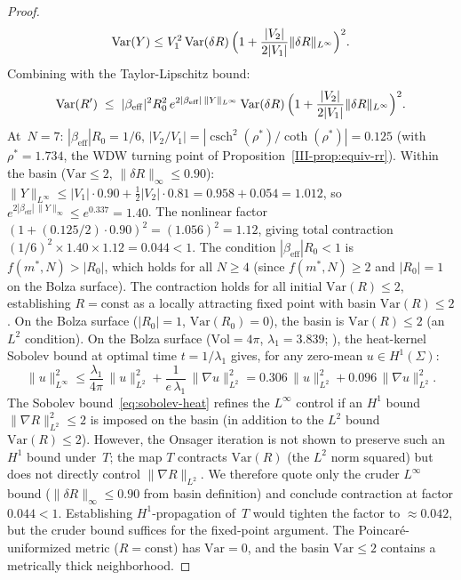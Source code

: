 \begin{proof}
\begin{equation}
  \mathrm{Var}(Y)
  \le V_1^2\,\mathrm{Var}(\delta R)\,
  \Bigl(1 + \frac{|V_2|}{2|V_1|}\|\delta R\|_{L^\infty}\Bigr)^2.
\end{equation}
Combining with the Taylor-Lipschitz bound:
\[
  \mathrm{Var}(R') \;\le\;
  |\beta_{\mathrm{eff}}|^2 R_0^2\,
  e^{2|\beta_{\mathrm{eff}}|\,\|Y\|_{L^\infty}}\,
  \mathrm{Var}(\delta R)\,
  \Bigl(1 + \frac{|V_2|}{2|V_1|}\|\delta R\|_{L^\infty}\Bigr)^2.
\]
At~$N = 7$: $|\beta_{\mathrm{eff}}| R_0 = 1/6$,
$|V_2/V_1| = |\operatorname{csch}^2(\rho^*)/\coth(\rho^*)| = 0.125$
(with $\rho^* = 1.734$, the WDW turning point of
Proposition~\ref*{III-prop:equiv-rr}).
Within the basin ($\mathrm{Var} \le 2$, $\|\delta R\|_\infty \le 0.90$):
$\|Y\|_{L^\infty} \le |V_1|\cdot 0.90 + \tfrac12|V_2|\cdot 0.81
= 0.958 + 0.054 = 1.012$,
so $e^{2|\beta_{\mathrm{eff}}|\,\|Y\|_\infty} \le e^{0.337} = 1.40$.
The nonlinear factor
$(1 + (0.125/2)\cdot 0.90)^2 = (1.056)^2 = 1.12$,
giving total contraction
$(1/6)^2 \times 1.40 \times 1.12 = 0.044 < 1$.
The condition $|\beta_{\mathrm{eff}}| R_0 < 1$ is
$f(m^*,N) > |R_0|$, which holds for all $N \ge 4$
(since $f(m^*,N) \ge 2$ and $|R_0| = 1$ on the Bolza surface).
The contraction holds for all
initial $\mathrm{Var}(R) \le 2$,
establishing $R = \mathrm{const}$ as a locally attracting
fixed point with basin $\mathrm{Var}(R) \le 2$.
On the Bolza surface ($|R_0| = 1$, $\mathrm{Var}(R_0) = 0$),
the basin is $\mathrm{Var}(R) \le 2$ (an $L^2$ condition).
On the Bolza surface ($\mathrm{Vol} = 4\pi$,
$\lambda_1 = 3.839$; \citealt{Buser1992}), the
heat-kernel Sobolev bound at optimal time
$t = 1/\lambda_1$ gives, for any zero-mean
$u \in H^1(\Sigma)$:
\begin{equation}\label{eq:sobolev-heat}
  \|u\|_{L^\infty}^2
  \le \frac{\lambda_1}{4\pi}\,\|u\|_{L^2}^2
  + \frac{1}{e\,\lambda_1}\,\|\nabla u\|_{L^2}^2
  = 0.306\,\|u\|_{L^2}^2 + 0.096\,\|\nabla u\|_{L^2}^2.
\end{equation}
The Sobolev bound~\eqref{eq:sobolev-heat} refines the
$L^\infty$ control if an $H^1$ bound
$\|\nabla R\|_{L^2}^2 \le 2$ is imposed on the basin
(in addition to the $L^2$ bound $\mathrm{Var}(R) \le 2$).
However, the Onsager iteration is not shown to preserve
such an $H^1$ bound under~$T$; the map $T$ contracts
$\mathrm{Var}(R)$ (the $L^2$ norm squared) but does
not directly control $\|\nabla R\|_{L^2}$.
We therefore quote only the cruder $L^\infty$ bound
($\|\delta R\|_\infty \le 0.90$ from basin definition)
and conclude contraction at factor $0.044 < 1$.
Establishing $H^1$-propagation of~$T$ would tighten
the factor to $\approx 0.042$, but the cruder bound
suffices for the fixed-point argument.
The Poincar\'e-uniformized metric ($R = \mathrm{const}$) has
$\mathrm{Var} = 0$, and the basin $\mathrm{Var} \le 2$
contains a metrically thick neighborhood.


\end{proof}
